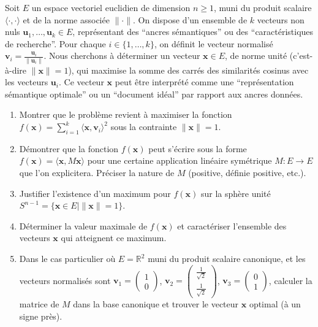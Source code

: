 \documentclass[11pt,a4paper]{report}
\begin{document}
Soit \(E\) un espace vectoriel euclidien de dimension \(n \ge 1\), muni
du produit scalaire \(\langle \cdot, \cdot \rangle\) et de la norme
associée \(\|\cdot\|\). On dispose d'un ensemble de \(k\) vecteurs non
nuls \(\mathbf{u}_1, \dots, \mathbf{u}_k \in E\), représentant des
``ancres sémantiques'' ou des ``caractéristiques de recherche''. Pour
chaque \(i \in \{1, \dots, k\}\), on définit le vecteur normalisé
\(\mathbf{v}_i = \frac{\mathbf{u}_i}{\|\mathbf{u}_i\|}\). Nous cherchons
à déterminer un vecteur \(\mathbf{x} \in E\), de norme unité
(c'est-à-dire \(\|\mathbf{x}\|=1\)), qui maximise la somme des carrés
des similarités cosinus avec les vecteurs \(\mathbf{u}_i\). Ce vecteur
\(\mathbf{x}\) peut être interprété comme une ``représentation
sémantique optimale'' ou un ``document idéal'' par rapport aux ancres
données.

\begin{enumerate}
\def\labelenumi{\arabic{enumi}.}

\item
  Montrer que le problème revient à maximiser la fonction
  \(f(\mathbf{x}) = \sum_{i=1}^k \langle \mathbf{x}, \mathbf{v}_i \rangle^2\)
  sous la contrainte \(\|\mathbf{x}\|=1\).
\item
  Démontrer que la fonction \(f(\mathbf{x})\) peut s'écrire sous la
  forme \(f(\mathbf{x}) = \langle \mathbf{x}, M\mathbf{x} \rangle\) pour
  une certaine application linéaire symétrique \(M: E \to E\) que l'on
  explicitera. Préciser la nature de \(M\) (positive, définie positive,
  etc.).
\item
  Justifier l'existence d'un maximum pour \(f(\mathbf{x})\) sur la
  sphère unité \(S^{n-1} = \{\mathbf{x} \in E \mid \|\mathbf{x}\|=1\}\).
\item
  Déterminer la valeur maximale de \(f(\mathbf{x})\) et caractériser
  l'ensemble des vecteurs \(\mathbf{x}\) qui atteignent ce maximum.
\item
  Dans le cas particulier où \(E = \mathbb{R}^2\) muni du produit
  scalaire canonique, et les vecteurs normalisés sont
  \(\mathbf{v}_1 = \begin{pmatrix} 1 \\ 0 \end{pmatrix}\),
  \(\mathbf{v}_2 = \begin{pmatrix} \frac{1}{\sqrt{2}} \\ \frac{1}{\sqrt{2}} \end{pmatrix}\),
  \(\mathbf{v}_3 = \begin{pmatrix} 0 \\ 1 \end{pmatrix}\), calculer la
  matrice de \(M\) dans la base canonique et trouver le vecteur
  \(\mathbf{x}\) optimal (à un signe près).
\end{enumerate}
\end{document}

